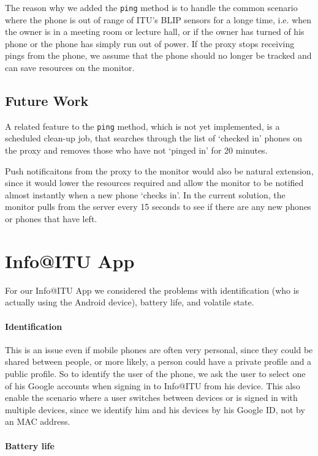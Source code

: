 \documentclass{ubicomp2011}
\begin{document}
The reason why we added the \texttt{ping} method is to handle the common scenario where the phone is out of range of ITU's BLIP sensors for a longe time, i.e. when the owner is in a meeting room or lecture hall, or if the owner has turned of his phone or the phone has simply run out of power. If the proxy stops receiving pings from the phone, we assume that the phone should no longer be tracked and can save resources on the monitor.
\subsection{Future Work}

A related feature to the \texttt{ping} method, which is not yet implemented, is a scheduled clean-up job, that searches through the list of `checked in' phones on the proxy and removes those who have not `pinged in' for 20 minutes.

Push notificaitons from the proxy to the monitor would also be natural extension, since it would lower the resources required and allow the monitor to be notified almost instantly when a new phone `checks in'. In the current solution, the monitor pulls from the server every 15 seconds to see if there are any new phones or phones that have left.
\section{Info@ITU App}

For our Info@ITU App we considered the problems with identification (who is actually using the Android device), battery life, and volatile state.
\paragraph{Identification}

This is an issue even if mobile phones are often very personal, since they could be shared between people, or more likely, a person could have a private profile and a public profile. So to identify the user of the phone, we ask the user to select one of his Google accounts when signing in to Info@ITU from his device. This also enable the scenario where a user switches between devices or is signed in with multiple devices, since we identify him and his devices by his Google ID, not by an MAC address.
\paragraph{Battery life}
\end{document}
